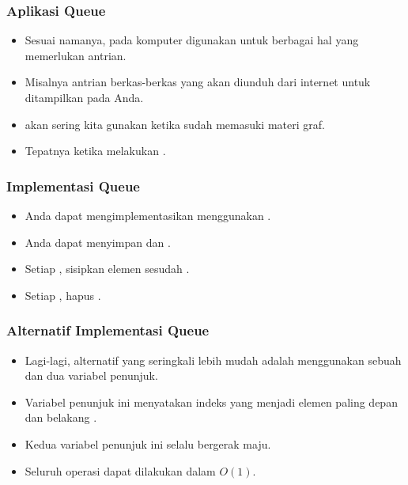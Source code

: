 \begin{frame}
\frametitle{Aplikasi Queue}
\begin{itemize}
  \item Sesuai namanya, pada komputer  digunakan untuk berbagai hal yang memerlukan antrian.
  \item Misalnya antrian berkas-berkas yang akan diunduh dari internet untuk ditampilkan pada  Anda.
  \item {} akan sering kita gunakan ketika sudah memasuki materi graf.
  \item Tepatnya ketika melakukan .
\end{itemize}
\end{frame}

\begin{frame}
\frametitle{Implementasi Queue}
\begin{itemize}
  \item Anda dapat mengimplementasikan  menggunakan .
  \item Anda dapat menyimpan   dan .
  \item Setiap , sisipkan elemen sesudah .
  \item Setiap , hapus  .
\end{itemize}
\end{frame}

\begin{frame}
\frametitle{Alternatif Implementasi Queue}
\begin{itemize}
  \item Lagi-lagi, alternatif yang seringkali lebih mudah adalah menggunakan sebuah  dan dua variabel penunjuk.
  \item Variabel penunjuk ini menyatakan indeks  yang menjadi elemen paling depan dan belakang .
  \item Kedua variabel penunjuk ini selalu bergerak maju.
  \item Seluruh operasi dapat dilakukan dalam $O(1)$.
\end{itemize}
\end{frame}

